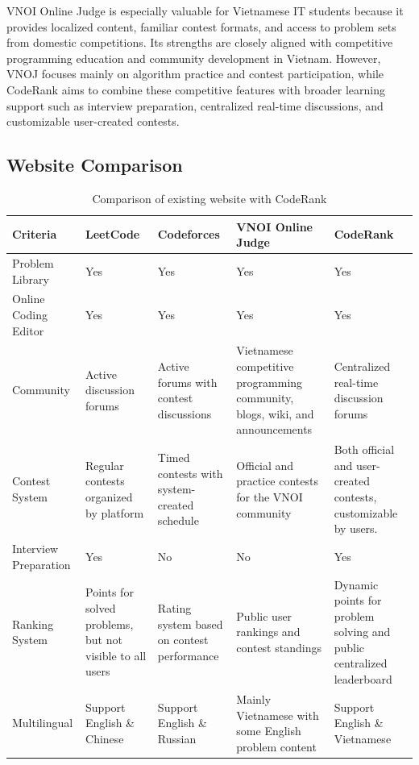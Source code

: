 VNOI Online Judge is especially valuable for Vietnamese IT students because it provides localized content, familiar contest formats, and access to problem sets from domestic competitions. Its strengths are closely aligned with competitive programming education and community development in Vietnam. However, VNOJ focuses mainly on algorithm practice and contest participation, while CodeRank aims to combine these competitive features with broader learning support such as interview preparation, centralized real-time discussions, and customizable user-created contests.

\subsection{Website Comparison}
\begin{table}[h!]
\centering
\renewcommand{\arraystretch}{1.3}
\caption{Comparison of existing website with CodeRank}
\label{tab:website-comparison}
\begin{tabularx}{\textwidth}{|l|X|X|X|X|}
\hline
\textbf{Criteria} & \textbf{LeetCode} & \textbf{Codeforces} & \textbf{VNOI Online Judge} & \textbf{CodeRank} \\
\hline
Problem Library & Yes & Yes & Yes & Yes \\
\hline
Online Coding Editor & Yes & Yes & Yes & Yes \\
\hline
Community & Active discussion forums & Active forums with contest discussions & Vietnamese competitive programming community, blogs, wiki, and announcements & Centralized real-time discussion forums \\
\hline
Contest System & Regular contests organized by platform & Timed contests with system-created schedule & Official and practice contests for the VNOI community & Both official and user-created contests, customizable by users. \\
\hline
Interview Preparation & Yes & No & No & Yes \\
\hline
Ranking System & Points for solved problems, but not visible to all users & Rating system based on contest performance & Public user rankings and contest standings & Dynamic points for problem solving and public centralized leaderboard \\
\hline
Multilingual & Support English \& Chinese & Support English \& Russian & Mainly Vietnamese with some English problem content & Support English \& Vietnamese \\
\hline
\end{tabularx}
\end{table}

